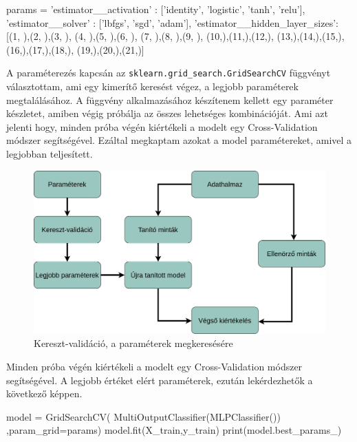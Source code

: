 \begin{python}
params = {
            'estimator__activation' : ['identity', 'logistic',
            			       'tanh', 'relu'],
            'estimator__solver' : ['lbfgs', 'sgd', 'adam'],
            'estimator__hidden_layer_sizes': [(1, ),(2, ),(3, ),
            				      (4, ),(5, ),(6, ),
            				      (7, ),(8, ),(9, ),
            				      (10,),(11,),(12,),
            				      (13,),(14,),(15,),
            				      (16,),(17,),(18,),
            				      (19,),(20,),(21,)]
}
\end{python}

A paraméterezés kapcsán az \texttt{sklearn.grid\_search.GridSearchCV} függvényt választottam, ami egy kimerítő keresést végez, a legjobb paraméterek megtalálásához. A függvény alkalmazásához készítenem kellett egy paraméter készletet, amiben végig próbálja az összes lehetséges kombinációját. Ami azt jelenti hogy, minden próba végén kiértékeli a modelt egy Cross-Validation módszer segítségével. Ezáltal megkaptam azokat a model paramétereket, amivel a legjobban teljesített.
\begin{figure}[h!]
\centering
\includegraphics[scale=0.3]{images/gridSearch.png}
\caption{Kereszt-validáció, a paraméterek megkeresésére}
\label{fig:neuralnetwork}
\end{figure}

Minden próba végén kiértékeli a modelt egy Cross-Validation módszer segítségével. A legjobb értéket elért paraméterek, ezután lekérdezhetők a következő képpen.

\begin{python}
model = GridSearchCV( MultiOutputClassifier(MLPClassifier())
  ,param_grid=params)
model.fit(X_train,y_train)
print(model.best_params_)
\end{python} 

